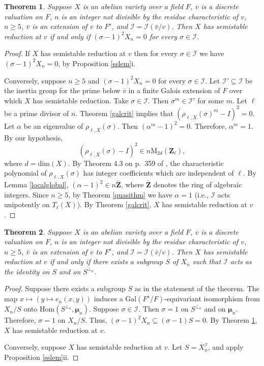 \documentclass{amsart}
\def\Z{{\mathbf Z}}
\def\Gal{\mathrm{Gal}}
\def\Hom{\mathrm{Hom}}
\def\I{{\mathcal I}}
\def\M{\mathrm{M}}
\def\dim{\mathrm{dim}}
\def\bmu{\boldsymbol \mu}
\newtheorem{thm}{Theorem}[section]
\theoremstyle{definition}
\begin{document}
\begin{thm}
\label{ssredlem}
Suppose $X$ is an abelian variety over a field $F$, $v$ is a discrete 
valuation on $F$, $n$ is an integer not 
divisible by the residue characteristic of $v$, $n \ge 5$, 
${\bar v}$ is an extension of $v$ to $F^s$,
and $\I = \I({\bar v}/v)$. 
Then $X$ has semistable reduction at $v$ if and only if
$(\sigma - 1)^2 X_n = 0$ for every $\sigma \in \I$.
\end{thm}

\begin{proof}
If $X$ has semistable reduction at $v$ then
for every $\sigma \in \I$ we have $(\sigma - 1)^2 X_n = 0$, 
by Proposition \ref{sslem}i. 

Conversely, suppose $n \ge 5$ and $(\sigma - 1)^2 X_n = 0$
for every $\sigma \in \I$.
Let $\I' \subseteq \I$ be the inertia group for the prime 
below ${\bar v}$ in a
finite Galois extension of $F$ over which $X$ has 
semistable reduction.
Take $\sigma \in \I$. Then 
$\sigma^m \in \I'$ for some $m$.
Let $\ell$ be a prime divisor of $n$. 
Theorem \ref{galcrit} implies that
$(\rho_{\ell,X}(\sigma)^m - I)^2 = 0$.
Let $\alpha$ be an eigenvalue of $\rho_{\ell,X}(\sigma)$.
Then $(\alpha^m - 1)^2 = 0$.
Therefore, $\alpha^m = 1$.
By our hypothesis, 
$$(\rho_{\ell,X}(\sigma) - I)^2 \in n\M_{2d}(\Z_\ell),$$
where $d = \dim(X)$.
By Theorem 4.3 on p.~359 of \cite{SGA}, 
the characteristic polynomial of $\rho_{\ell,X}(\sigma)$
has integer coefficients which are independent of $\ell$.
By Lemma \ref{localglobal},
$(\alpha - 1)^2 \in n{\bar \Z}$, where ${\bar \Z}$ denotes
the ring of algebraic integers.
Since $n \ge 5$,
by Theorem \ref{quasithm} we have $\alpha = 1$ (i.e., 
$\I$ acts unipotently on $T_\ell(X)$).
By Theorem \ref{galcrit}, $X$ has semistable reduction at $v$.
\end{proof}

\begin{thm}
\label{ssredconverse}
Suppose $X$ is an abelian variety over a field $F$, $v$ is a discrete 
valuation on $F$, $n$ is an integer not divisible by the residue 
characteristic of $v$, $n \ge 5$, ${\bar v}$ is an extension of
$v$ to $F^s$, and $\I = \I({\bar v}/v)$. Then $X$ has semistable 
reduction at $v$ if and only if there exists a subgroup $S$ of $X_n$
such that $\I$ acts as the identity on $S$ and on $S^{\perp_n}$.
\end{thm}

\begin{proof}
Suppose there exists a subgroup $S$ as in the statement of the
theorem. The map $x \mapsto (y \mapsto e_n(x,y))$ induces a
$\Gal(F^s/F)$-equivariant isomorphism from $X_n/S$ onto
$\Hom(S^{\perp_n},\bmu_n)$. Suppose $\sigma \in \I$. Then 
$\sigma = 1$ on $S^{\perp_n}$ and on $\bmu_n$. Therefore, $\sigma = 1$ on
$X_n/S$. Thus, 
$(\sigma - 1)^2X_n \subseteq (\sigma - 1)S = 0$.
By Theorem \ref{ssredlem}, $X$ has semistable reduction at $v$.

Conversely, suppose $X$ has semistable reduction at $v$. 
Let $S = X_n^\I$, and apply Proposition \ref{sslem}ii.
\end{proof}
\end{document}
